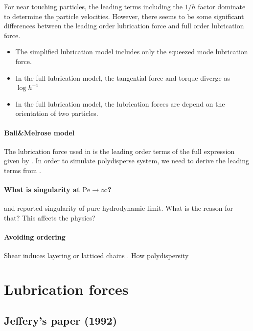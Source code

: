\documentclass[12pt]{article}
\begin{document}
For near touching particles,
the leading terms including the $1/h$ factor
dominate to determine the particle velocities.
%
However, there seems
to be some significant differences
between the leading order lubrication force 
and full order lubrication force.

\begin{itemize}
  \item The simplified lubrication model
  includes only the squeezed mode lubrication force.
  \item 
  In the full lubrication model,
  the tangential force and torque
  diverge as $\log h^{-1}$
  \item 
  In the full lubrication model,
  the lubrication forces are depend on
  the orientation of two particles.
  \end{itemize}


\paragraph{Ball\&Melrose model}

The lubrication force used in \cite{Ball_1997}
is the leading order terms of 
the full expression given by \citet{Jeffrey_1992}.
%
In order to simulate  polydisperse system,
we need to derive 
the leading terms from \citet{Jeffrey_1992}.


\paragraph{What is singularity at $\mathrm{Pe}\to \infty$?}

\citet{Ball_1995}
and \citet{Melrose_1995}
reported singularity of pure hydrodynamic limit.
%
What is the reason for that?
%
This affects the physics?
%

\paragraph{Avoiding ordering}

Shear induces layering or latticed chains \citep{Catherall_2000}.
%
How polydispersity


\newpage


\section{Lubrication forces}

\subsection*{Jeffery's paper (1992)}
\end{document}
